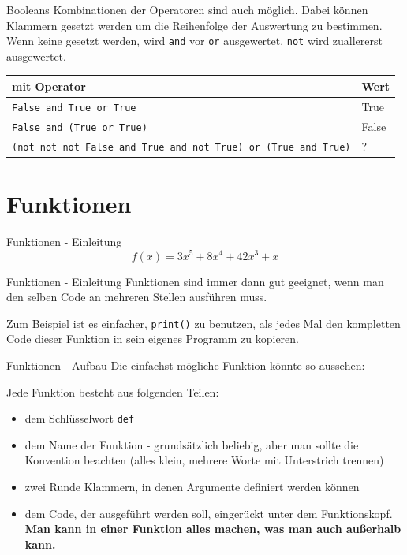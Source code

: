 \begin{frame}{Booleans}
	Kombinationen der Operatoren sind auch möglich. Dabei können Klammern gesetzt werden um die Reihenfolge der Auswertung zu bestimmen. Wenn keine gesetzt werden, wird \alert{\texttt{and}} vor \alert{\texttt{or}} ausgewertet. \alert{\texttt{not}} wird zuallererst ausgewertet.
	\begin{center}
		\begin{tabular}{m{8cm} | m{1cm}}
			\hline\hline
			mit Operator & Wert \\
			\hline\hline
			\texttt{False and True or True} & True \\
			\texttt{False and (True or True)} & False \\
			\texttt{(not not not False and True and not True) or (True and True)} & ?
		\end{tabular}
	\end{center}
\end{frame}


\section{Funktionen}
\begin{frame}{Funktionen - Einleitung}
		\Large $$ f(x) = 3x^5 + 8x^4 + 42x^3 + x $$
\end{frame}

\begin{frame}{Funktionen - Einleitung}
	Funktionen sind immer dann gut geeignet, wenn man den selben Code an mehreren Stellen ausführen muss.
		
	Zum Beispiel ist es einfacher, \alert{\texttt{print()}} zu benutzen, als jedes Mal den kompletten Code dieser Funktion in sein eigenes Programm zu kopieren.
\end{frame}

\begin{frame}{Funktionen - Aufbau}
	Die einfachst mögliche Funktion könnte so aussehen:
	
	\pause
	Jede Funktion besteht aus folgenden Teilen:
	\pause
	\begin{itemize}
		\item dem Schlüsselwort \alert{\texttt{def}}
		\pause
		\item dem Name der Funktion - grundsätzlich beliebig, aber man sollte  die Konvention beachten (alles klein, mehrere Worte mit Unterstrich trennen)
		\pause
		\item zwei Runde Klammern, in denen Argumente definiert werden können
		\pause
		\item dem Code, der ausgeführt werden soll, eingerückt unter dem Funktionskopf. \textbf{Man kann in einer Funktion alles machen, was man auch außerhalb kann.}
	\end{itemize}
\end{frame}

